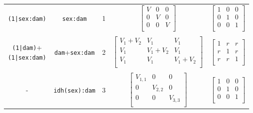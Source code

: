 \documentclass{article}
\begin{document}
\begin{landscape}
\begin{table}
\begin{center}
\begin{tabular}{ccccc}
\texttt{(1|sex:dam)}&\texttt{sex:dam}&1&
$\left[
\begin{array}{ccc}
V&0&0\\
0&V&0\\
0&0&V\\
\end{array}
\right]$
&
$\left[
\begin{array}{ccc}
1&0&0\\
0&1&0\\
0&0&1\\
\end{array}
\right]$\\
\\
\texttt{(1|dam)}+\texttt{(1|sex:dam)}&\texttt{dam}+\texttt{sex:dam}&2&
$\left[
\begin{array}{ccc}
V_{1}+V_{2}&V_{1}&V_{1}\\
V_{1}&V_{1}+V_{2}&V_{1}\\
V_{1}&V_{1}&V_{1}+V_{2}\\
\end{array}
\right]$
&
$\left[
\begin{array}{ccc}
1&r&r\\
r&1&r\\
r&r&1\\
\end{array}
\right]$\\
\\
-&\texttt{idh(sex):dam}&3&
$\left[
\begin{array}{ccc}
V_{1,1}&0&0\\
0&V_{2,2}&0\\
0&0&V_{3,3}\\
\end{array}
\right]$
&
$\left[
\begin{array}{ccc}
1&0&0\\
0&1&0\\
0&0&1\\
\end{array}
\right]$\\

\end{tabular}
\end{center}
\end{table}
\end{landscape}
\end{document}
